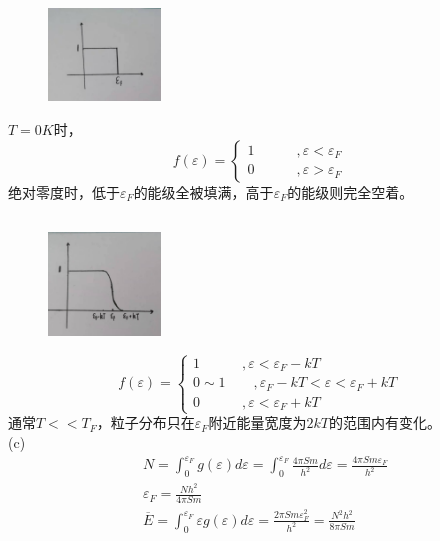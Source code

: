 \documentclass[UTF8]{ctexart}
\begin{document}
\subsection*{}
\begin{figure}
  \includegraphics[width=3cm]{4b1.jpg}
\end{figure}
$T=0K$时，\\
\begin{equation*}
  f(\varepsilon)=\begin{cases}
    1\quad\quad\quad ,\varepsilon<\varepsilon_F \\
    0\quad\quad\quad ,\varepsilon>\varepsilon_F
  \end{cases}
\end{equation*}
绝对零度时，低于$\varepsilon_F$的能级全被填满，高于$\varepsilon_F$的能级则完全空着。
\subsection*{}
\begin{figure}
  \includegraphics[width=3cm]{4b2.jpg}
\end{figure}
\begin{equation*}
  f(\varepsilon)=\begin{cases}
    1\quad\quad\quad ,\varepsilon<\varepsilon_F-kT                  \\
    0\sim1\quad\quad ,\varepsilon_F-kT<\varepsilon<\varepsilon_F+kT \\
    0\quad\quad\quad, \varepsilon<\varepsilon_F+kT
  \end{cases}
\end{equation*}
通常$T<<T_F$，粒子分布只在$\varepsilon_F$附近能量宽度为$2kT$的范围内有变化。\\
(c)
\begin{equation*}
  \begin{aligned}
     & N=\int_0^{\varepsilon_F}g(\varepsilon)d\varepsilon
    =\int_0^{\varepsilon_F}\frac{4\pi Sm}{h^2}d\varepsilon
    =\frac{4\pi Sm\varepsilon_F}{h^2}                                            \\
     & \varepsilon_F=\frac{Nh^2}{4\pi Sm}                                        \\
     & \overline{E}=\int_0^{\varepsilon_F}\varepsilon g(\varepsilon)d\varepsilon
    =\frac{2\pi Sm\varepsilon_F^2}{h^2}
    =\frac{N^2h^2}{8\pi Sm}
  \end{aligned}
\end{equation*}
\end{document}
